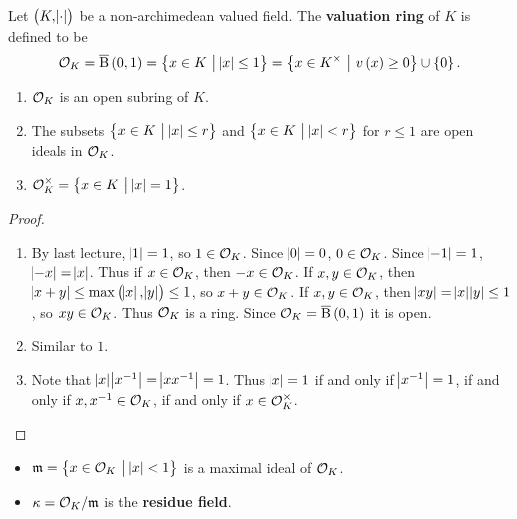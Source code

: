 \begin{definition}
Let $ \br{K, \abs{\cdot}} $ be a non-archimedean valued field. The \textbf{valuation ring} of $ K $ is defined to be
$$ \OOO_K = \overline{\B}\br{0, 1} = \cbr{x \in K \st \abs{x} \le 1} = \cbr{x \in K^\times \st v\br{x} \ge 0} \cup \cbr{0}. $$
\end{definition}

\begin{proposition}
\hfill
\begin{enumerate}
\item $ \mathcal{O}_K $ is an open subring of $ K $.
\item The subsets $ \cbr{x \in K \st \abs{x} \le r} $ and $ \cbr{x \in K \st \abs{x} < r} $ for $ r \le 1 $ are open ideals in $ \mathcal{O}_K $.
\item $ \OOO_K^\times = \cbr{x \in K \st \abs{x} = 1} $.
\end{enumerate}
\end{proposition}

\begin{proof}
\hfill
\begin{enumerate}
\item By last lecture, $ \abs{1} = 1 $, so $ 1 \in \mathcal{O}_K $. Since $ \abs{0} = 0 $, $ 0 \in \mathcal{O}_K $. Since $ \abs{-1} = 1 $, $ \abs{-x} = \abs{x} $. Thus if $ x \in \mathcal{O}_K $, then $ -x \in \mathcal{O}_K $. If $ x, y \in \mathcal{O}_K $, then $ \abs{x + y} \le \max\br{\abs{x}, \abs{y}} \le 1 $, so $ x + y \in \mathcal{O}_K $. If $ x, y \in \mathcal{O}_K $, then $ \abs{xy} = \abs{x}\abs{y} \le 1 $, so $ xy \in \mathcal{O}_K $. Thus $ \mathcal{O}_K $ is a ring. Since $ \OOO_K = \overline{\B}\br{0, 1} $ it is open.
\item Similar to $ 1 $.
\item Note that $ \abs{x}\abs{x^{-1}} = \abs{xx^{-1}} = 1 $. Thus $ \abs{x} = 1 $ if and only if $ \abs{x^{-1}} = 1 $, if and only if $ x, x^{-1} \in \mathcal{O}_K $, if and only if $ x \in \mathcal{O}_K^\times $.
\end{enumerate}
\end{proof}

\begin{notation*}
\hfill
\begin{itemize}
\item $ \mmm = \cbr{x \in \OOO_K \st \abs{x} < 1} $ is a maximal ideal of $ \mathcal{O}_K $.
\item $ \kappa = \mathcal{O}_K / \mathfrak{m} $ is the \textbf{residue field}.
\end{itemize}
\end{notation*}

